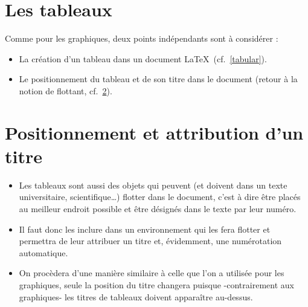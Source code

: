 

\section{Les tableaux}
\label{tableaux}

\vfill 

Comme pour les graphiques, deux points indépendants sont à considérer :

\begin{itemize}
\item La création d'un tableau dans un document \LaTeX\ (cf.~\ref{tabular}).
\item Le positionnement du tableau et de son titre dans le document (retour à la
  notion de flottant, cf.~\ref{table}).
\end{itemize}

\vfill
















\section{Positionnement et attribution d'un titre}
\label{table}

\begin{itemize}
\item Les tableaux sont aussi des objets qui peuvent (et doivent dans
  un texte universitaire, scientifique\ldots) flotter dans le
  document, c'est à dire être placés au meilleur endroit possible et
  être désignés dans le texte par leur numéro.
\item Il faut donc les inclure dans un environnement qui les fera flotter et
  permettra de leur attribuer un titre et, évidemment, une numérotation
  automatique.
\item On procèdera d'une manière similaire à celle que l'on a utilisée pour les
  graphiques, seule la position du titre changera puisque -contrairement aux
  graphiques- les titres de tableaux doivent apparaître au-dessus.
\end{itemize}

